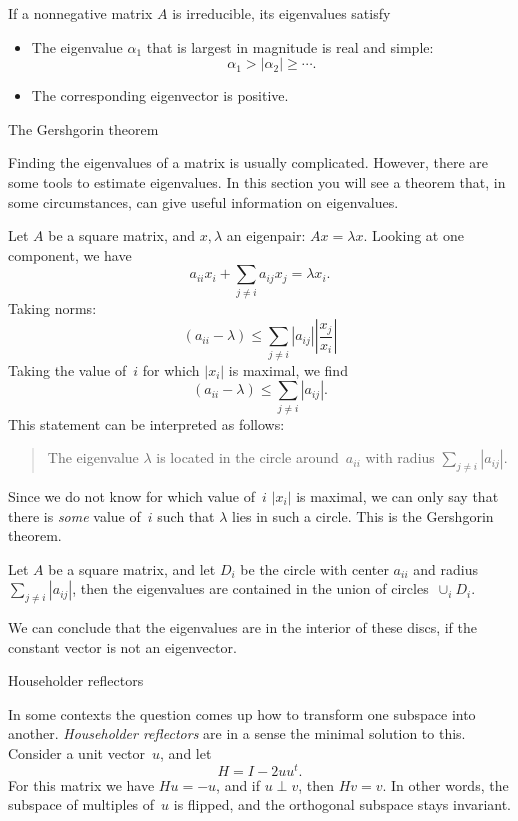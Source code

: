 \begin{theorem}
  If a nonnegative matrix $A$ is irreducible, its eigenvalues
  satisfy
  \begin{itemize}
  \item The eigenvalue $\alpha_1$ that is largest in magnitude is real
    and simple:
    \[ \alpha_1> |\alpha_2|\geq\cdots. \]
  \item The corresponding eigenvector is positive.
  \end{itemize}
\end{theorem}


 {The Gershgorin theorem}
\label{app:gershgorin}

Finding the eigenvalues of a matrix is usually complicated. However,
there are some tools to estimate eigenvalues. In this section you will
see a theorem that, in some circumstances, can give useful information
on eigenvalues.

Let $A$ be a square matrix, and $x,\lambda$ an eigenpair: $Ax=\lambda
x$. Looking at one component, we have
\[ a_{ii}x_i+\sum_{j\not=i} a_{ij}x_j=\lambda x_i. \]
Taking norms:
\[ (a_{ii}-\lambda) \leq \sum_{j\not=i} |a_{ij}|
   \left|\frac{x_j}{x_i}\right|
\]
Taking the value of~$i$ for which $|x_i|$ is maximal, we find
\[ (a_{ii}-\lambda) \leq \sum_{j\not=i} |a_{ij}|.
\]
This statement can be interpreted as follows: 
\begin{quotation}
  The eigenvalue $\lambda$ is located in the circle around~$a_{ii}$
  with radius $\sum_{j\not=i}|a_{ij}|$.
\end{quotation}
Since we do not know for which value of~$i$ $|x_i|$ is maximal, we can
only say that there is \emph{some} value of~$i$ such that $\lambda$
lies in such a circle. This is the Gershgorin theorem.

\begin{theorem}
  Let $A$ be a square matrix, and let $D_i$ be the circle with center
  $a_{ii}$ and radius $\sum_{j\not=i}|a_{ij}|$, then the eigenvalues
  are contained in the union of circles~$\cup_i D_i$.
\end{theorem}

We can conclude that the eigenvalues are in the interior of these
discs, if the constant vector is not an eigenvector.

 {Householder reflectors}
\label{app:reflector}

In some contexts the question comes up how to transform one subspace into another.
\emph{Householder reflectors} are in a sense the minimal solution to this. Consider
a unit vector~$u$, and let \[ H= I-2uu^t. \]
For this matrix we have $Hu=-u$, and if $u\perp v$, then $Hv=v$.
In other words, the subspace of multiples of~$u$ is 
flipped, and the orthogonal subspace stays invariant.

